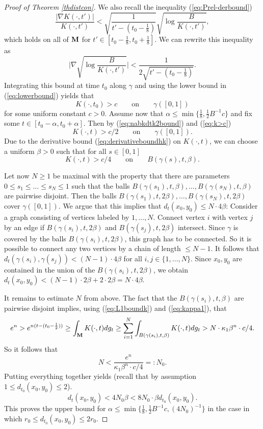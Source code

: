 \documentclass[11pt]{amsart}
\numberwithin{equation}{section}
\def\M{{\bf M}}
\numberwithin{equation}{section}
\begin{document}
\begin{proof}[Proof of Theorem \ref{thdistcon}]
We also recall the inequality (\ref{eq:Prel-derbound})
\[ \frac{|\nabla K (\cdot, t')|}{K (\cdot, t')} < \sqrt{\frac1{t' - (t_0 -\frac18)}} \sqrt{\log \frac{B}{K(\cdot, t')}}, \]
which holds on all of $\M$ for $t' \in [t_0 - \frac1{8}, t_0 + \frac1{8}]$.
We can rewrite this inequality as
\begin{equation} \label{eq:derivativeboundhk}
 \Bigg| \nabla \sqrt{ \log  \frac{B}{K(\cdot, t')}  } \Bigg| < \frac{1}{2\sqrt{t' - (t_0 - \frac18)}}.
\end{equation}
Integrating this bound at time $t_0$ along $\gamma$ and using the lower bound in (\ref{eq:lowerbound}) yields that
\begin{equation} \label{eq:k>c}
 K(\cdot, t_0) > c \qquad \text{on} \qquad \gamma([0,1])
\end{equation}
for some uniform constant $c > 0$.
Assume now that $\alpha \leq \min \{ \frac18, \frac12 B^{-1} c \}$ and fix some $t \in [t_0 - \alpha, t_0 + \alpha]$.
Then by (\ref{eq:nabkdtk2bound}) and (\ref{eq:k>c})
\[ K(\cdot, t) > c/2 \qquad \text{on} \qquad \gamma([0,1]). \]
Due to the derivative bound (\ref{eq:derivativeboundhk}) on $K (\cdot, t)$, we can choose a uniform $\beta > 0$ such that for all $s \in [0,1]$
\[ K(\cdot, t) >  c/4 \qquad \text{on} \qquad B(\gamma(s), t, \beta). \]

Let now $N \geq 1$ be maximal with the property that there are parameters $0 \leq s_1\leq \ldots \leq s_N \leq 1$ such that the balls $B(\gamma(s_1), t, \beta), \ldots, B(\gamma(s_N), t, \beta)$ are pairwise disjoint.
Then the balls $B(\gamma(s_1), t, 2\beta), \ldots, B(\gamma(s_N), t, 2 \beta)$ cover $\gamma([0,1])$.
We argue that this implies that $d_t (x_0, y_0) \leq N \cdot 4 \beta$:
Consider a graph consisting of vertices labeled by $1, \ldots, N$.
Connect vertex $i$ with vertex $j$ by an edge if $B(\gamma(s_i), t, 2 \beta)$ and $B(\gamma (s_j), t, 2 \beta)$ intersect.
Since $\gamma$ is covered by the balls $B(\gamma(s_i), t, 2 \beta)$, this graph has to be connected.
So it is possible to connect any two vertices by a chain of length $\leq N - 1$.
It follows that $d_t (\gamma(s_i), \gamma(s_j)) < (N-1) \cdot 4 \beta$ for all $i, j \in \{ 1, \ldots, N \}$.
Since $x_0, y_0$ are contained in the union of the $B(\gamma(s_i), t, 2 \beta)$, we obtain $d_t (x_0, y_0) < (N-1) \cdot 2 \beta + 2 \cdot 2 \beta = N \cdot 4 \beta$.

It remains to estimate $N$ from above.
The fact that the $B(\gamma(s_i), t, \beta)$ are pairwise disjoint implies, using (\ref{eq:L1boundk}) and (\ref{eq:kappa1}), that
\[ e^n >  e^{n(t - (t_0 - \frac12))} \geq \int_{\M} K(\cdot, t) dg_t \geq \sum_{i=1}^N \int_{B(\gamma(s_i), t, \beta)} K(\cdot, t) dg_t > N \cdot \kappa_1 \beta^n \cdot c/4 . \]
So it follows that
\[ N < \frac{e^n}{\kappa_1 \beta^{n} \cdot c/4} =: N_0. \]
Putting everything together yields (recall that by assumption $1 \leq d_{t_0} (x_0, y_0 ) \leq 2$).
\[ d_t (x_0, y_0) < 4 N_0 \beta < 8 N_0 \cdot \beta d_{t_0} (x_0, y_0). \]
This proves the upper bound for $\alpha \leq \min \{ \frac18,  \frac12 B^{-1} c, (4N_0)^{-1} \}$ in the case in which $r_0 \leq d_{t_0} (x_0, y_0) \leq 2 r_0$.


\end{proof}
\end{document}
